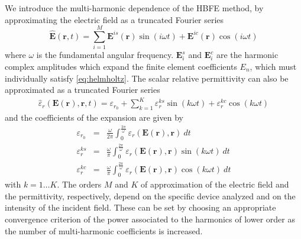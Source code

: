 \documentclass[journal]{IEEEtran}
\renewcommand{\vec}[1]{\mathbf{#1}}
\begin{document}
\par We introduce the multi-harmonic dependence of the HBFE method, by approximating the electric field as a truncated Fourier series \cite{Bachinger2005}
\begin{equation} \label{eq:field}
\vec{\hat{E}}(\vec{r}, t) = \sum^M_{i=1} \vec{E}^{is}(\vec{r}) \sin(i \omega t) + \vec{E}^{ic}(\vec{r}) \cos(i \omega t)
\end{equation} where $\omega$ is the fundamental angular frequency. $\vec{E}_{i}^{s}$ and $\vec{E}_{i}^{c}$ are the harmonic complex amplitudes which expand the finite element coefficients $E_n$, which must individually satisfy \eqref{eq:helmholtz}. 
The scalar relative permittivity can also be approximated as a truncated Fourier series 
\begin{eqnarray} \label{eq:eps}
\hat{{\varepsilon}}_r(\vec{E}(\vec{r}), \vec{r}, t) = {\varepsilon}_{r_{0}} + \sum^K_{k=1} {\varepsilon}_{r}^{ks} \sin(k \omega t) + {\varepsilon}_{r}^{kc} \cos(k \omega t)
\end{eqnarray} and the coefficients of the expansion are given by
\begin{eqnarray} \label{eq:epsCoeffs}
{\varepsilon}_{r_{0}} & = & \frac{\omega}{2\pi}\int_0^{\frac{2\pi}{\omega}} {\varepsilon}_r(\vec{E}(\vec{r}), \vec{r}) \ dt \\
{\varepsilon}_{r}^{ks} & = & \frac{\omega}{\pi}\int_0^{\frac{2\pi}{\omega}} {\varepsilon}_r(\vec{E}(\vec{r}), \vec{r}) \sin(k \omega t) \ dt \\
{\varepsilon}_{r}^{kc} & = & \frac{\omega}{\pi}\int_0^{\frac{2\pi}{\omega}} {\varepsilon}_r(\vec{E}(\vec{r}), \vec{r}) \cos(k \omega t) \ dt
\end{eqnarray} with $k = 1 \dots K$. The orders $M$ and $K$ of approximation of the electric field and the permittivity, respectively, depend on the specific device analyzed and on the intensity of the incident field. These can be set by choosing an appropriate convergence criterion of the power associated to the harmonics of lower order as the number of multi-harmonic coefficients is increased.
\end{document}
